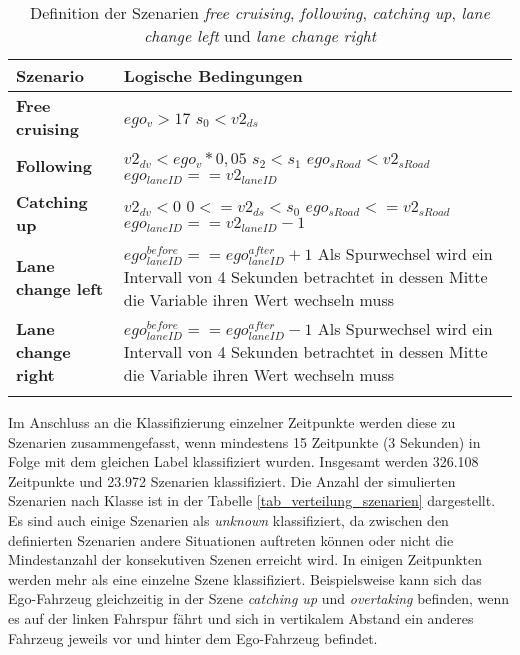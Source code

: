 \small
\begin{longtable}[c]{p{4cm} p{6cm}}
\textbf{Szenario} & \textbf{Logische Bedingungen} \\
\hline
\endhead

\textbf{Free cruising} & $ego_v > 17$ \newline $s_0 < v2_{ds}$ \\
\hline
\textbf{Following} & $v2_{dv} < ego_v * 0,05$ \newline $s_2 < s_1$ \newline $ego_{sRoad} < v2_{sRoad}$ \newline $ego_{laneID} == v2_{laneID}$ \\
\hline
\textbf{Catching up} & $v2_{dv} < 0$ \newline $0 <= v2_{ds} < s_0$ \newline $ego_{sRoad} <= v2_{sRoad}$ \newline $ego_{laneID} == v2_{laneID} - 1$ \\
\hline
\textbf{Lane change left} & $ego_{laneID}^{before} == ego_{laneID}^{after} + 1$ \newline Als Spurwechsel wird ein Intervall von 4 Sekunden betrachtet in dessen Mitte die Variable ihren Wert wechseln muss\\
\hline
\textbf{Lane change right} & $ego_{laneID}^{before} == ego_{laneID}^{after} - 1$ \newline Als Spurwechsel wird ein Intervall von 4 Sekunden betrachtet in dessen Mitte die Variable ihren Wert wechseln muss \\

\hline
\caption{Definition der Szenarien \textit{free cruising}, \textit{following}, \textit{catching up}, \textit{lane change left} und \textit{lane change right}}
\label{tab_definition_szenarios}
\end{longtable}
\normalsize

Im Anschluss an die Klassifizierung einzelner Zeitpunkte werden diese zu Szenarien zusammengefasst, wenn mindestens 15 Zeitpunkte (3 Sekunden) in Folge mit dem gleichen Label klassifiziert wurden. Insgesamt werden 326.108 Zeitpunkte und 23.972 Szenarien klassifiziert. Die Anzahl der simulierten Szenarien nach Klasse ist in der Tabelle \ref{tab_verteilung_szenarien} dargestellt. Es sind auch einige Szenarien als \textit{unknown} klassifiziert, da zwischen den definierten Szenarien andere Situationen auftreten können oder nicht die Mindestanzahl der konsekutiven Szenen erreicht wird. In einigen Zeitpunkten werden mehr als eine einzelne Szene klassifiziert. Beispielsweise kann sich das Ego-Fahrzeug gleichzeitig in der Szene \textit{catching up} und \textit{overtaking} befinden, wenn es auf der linken Fahrspur fährt und sich in vertikalem Abstand ein anderes Fahrzeug jeweils vor und hinter dem Ego-Fahrzeug befindet.

